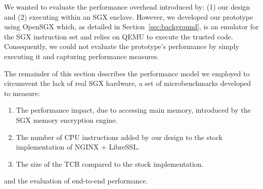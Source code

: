 \documentclass[../../main.tex]{subfiles}
\begin{document}
We wanted to evaluate the performance overhead introduced by: (1) our design
and (2) executing within an SGX enclave. However, we developed our prototype
using OpenSGX which, as detailed in Section~\ref{sec:background}, is an
emulator for the SGX instruction set and relies on QEMU to execute the trusted
code. Consequently, we could not evaluate the prototype's performance by
simply executing it and capturing performance measures.

The remainder of this section describes the performance model we employed to
circumvent the lack of real SGX hardware, a set of microbenchmarks developed
to measure:
\begin{enumerate}
  \item The performance impact, due to accessing main memory, introduced by
    the SGX memory encryption engine.
  \item The number of CPU instructions added by our design to the
    stock implementation of NGINX + LibreSSL.
  \item The size of the TCB compared to the stock implementation.
\end{enumerate}
and the evaluation of end-to-end performance.
\end{document}
